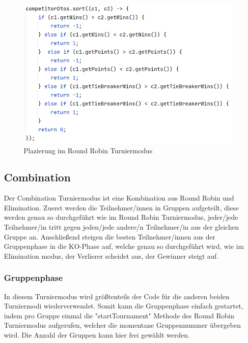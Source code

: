 \begin{figure}[H]
    \includegraphics[scale=0.6]{pics/backend/roundrobin/roundrobin_rankCompetitors.png}
    \caption{Plazierung im Round Robin Turniermodus}
\end{figure}

\subsection{Combination}

Der Combination Turniermodus ist eine Kombination aus Round Robin und Elimination. Zuerst werden die Teilnehmer/innen in Gruppen aufgeteilt, diese werden genau so durchgeführt wie im Round Robin Turniermodus, 
jeder/jede Teilnehmer/in tritt gegen jeden/jede andere/n Teilnehmer/in aus der gleichen Gruppe an. Anschließend steigen die besten Teilnehmer/innen aus der Gruppenphase in die KO-Phase auf, welche genau  so 
durchgeführt wird, wie im Elimination modus, der Verlierer scheidet aus, der Gewinner steigt auf.

\subsubsection{Gruppenphase}

In diesem Turniermodus wird größtenteils der Code für die anderen beiden Turniermodi wiederverwendet. Somit kann die Gruppenphase einfach gestartet, 
indem pro Gruppe einmal die "startTournament" Methode des Round Robin Turniermodus aufgerufen, welcher die momentane Gruppennummer übergeben wird. 
Die Anzahl der Gruppen kann hier frei gewählt werden.

